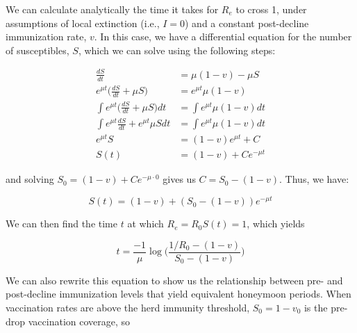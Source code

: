 \documentclass[12pt]{article}
\begin{document}
We can calculate analytically the time it takes for $R_e$ to cross 1, under assumptions of local extinction (i.e., $I = 0$) and a constant post-decline immunization rate, $v$. In this case, we have a differential equation for the number of susceptibles, $S$, which we can solve using the following steps:

\begin{align}
    \frac{dS}{dt} &= \mu (1-v) - \mu S \\
    e^{\mu t}\Big(\frac{dS}{dt} + \mu S \Big) &= e^{\mu t} \mu (1-v) \\
    \int e^{\mu t}\Big(\frac{dS}{dt} + \mu S \Big) dt &= \int e^{\mu t} \mu (1-v) dt \\
    \int e^{\mu t}\frac{dS}{dt} + e^{\mu t}\mu S dt &= \int e^{\mu t} \mu (1-v) dt \\
    e^{\mu t} S &= (1-v) e^{\mu t} + C \\
    S(t) &= (1-v) + C e^{-\mu t}
\end{align}

\noindent
and solving $S_0 = (1-v) + C e^{-\mu \cdot 0}$ gives us $C = S_0 - (1-v)$.
Thus, we have:

$$
S(t) = (1-v) + (S_0 - (1-v)) e^{-\mu t}
$$

\noindent
We can then find the time $t$ at which $R_e = R_0 S(t) = 1$, which yields

$$
t = \frac{-1}{\mu} \log \Big(\frac{1/R_0 - (1-v)}{S_0 - (1-v)}\Big)
$$

\noindent
We can also rewrite this equation to show us the relationship between pre- and post-decline immunization levels that yield equivalent honeymoon periods. When vaccination rates are above the herd immunity threshold, $S_0 = 1-v_0$ is the pre-drop vaccination coverage, so 

\end{document}
